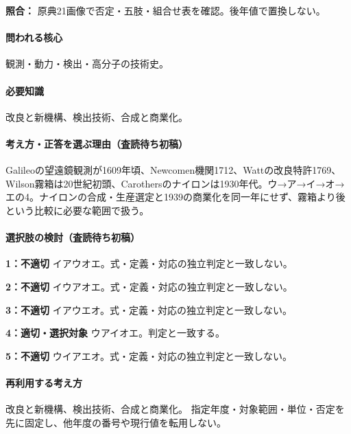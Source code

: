\noindent\textbf{照合：} 原典21画像で否定・五肢・組合せ表を確認。後年値で置換しない。\par

\paragraph{問われる核心} 観測・動力・検出・高分子の技術史。

\paragraph{必要知識} 改良と新機構、検出技術、合成と商業化。

\paragraph{考え方・正答を選ぶ理由（査読待ち初稿）} Galileoの望遠鏡観測が1609年頃、Newcomen機関1712、Wattの改良特許1769、Wilson霧箱は20世紀初頭、Carothersのナイロンは1930年代。ウ→ア→イ→オ→エの4。ナイロンの合成・生産選定と1939の商業化を同一年にせず、霧箱より後という比較に必要な範囲で扱う。

\paragraph{選択肢の検討（査読待ち初稿）}\mbox{}\par

\noindent\textbf{1：不適切} イアウオエ。式・定義・対応の独立判定と一致しない。\par

\noindent\textbf{2：不適切} イウアオエ。式・定義・対応の独立判定と一致しない。\par

\noindent\textbf{3：不適切} イアウエオ。式・定義・対応の独立判定と一致しない。\par

\noindent\textbf{4：適切・選択対象} ウアイオエ。判定と一致する。\par

\noindent\textbf{5：不適切} ウイアエオ。式・定義・対応の独立判定と一致しない。\par

\paragraph{再利用する考え方} 改良と新機構、検出技術、合成と商業化。 指定年度・対象範囲・単位・否定を先に固定し、他年度の番号や現行値を転用しない。

